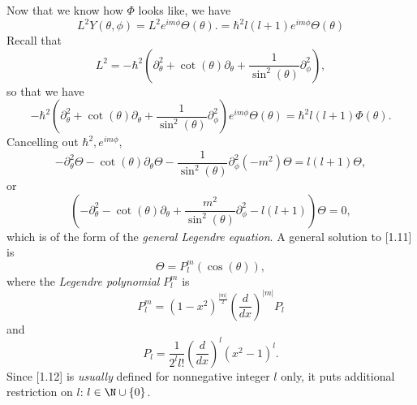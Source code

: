 \documentclass[phys334]{subfiles}
\begin{document}
    Now that we know how $\Phi$ looks like, we have
    \begin{equation*}
        L^{2}Y\left( \theta,\phi \right) = L^{2}e^{im\phi}\Theta\left( \theta \right). = \hbar^{2} l\left( l+1 \right)e^{im\phi}\Theta\left( \theta \right)
    \end{equation*}
    Recall that
    \begin{equation*}
        L^{2} = -\hbar^{2}\left( \partial_{\theta}^{2}+\cot\left( \theta \right)\partial_{\theta}+\frac{1}{\sin^{2}\left( \theta \right)}\partial_{\phi}^{2} \right) ,
    \end{equation*}
    so that we have
    \begin{equation*}
        -\hbar^{2}\left( \partial_{\theta}^{2}+\cot\left( \theta \right)\partial_{\theta}+\frac{1}{\sin^{2}\left( \theta \right)}\partial_{\phi}^{2} \right) e^{im\phi}\Theta\left( \theta \right) = \hbar^{2} l\left( l+1 \right)\Phi\left( \theta \right).
    \end{equation*}
    Cancelling out $\hbar^{2},e^{im\phi}$,
    \begin{equation*}
        -\partial_{\theta}^{2}\Theta-\cot\left( \theta \right)\partial_{\theta}\Theta-\frac{1}{\sin^{2}\left( \theta \right)}\partial_{\phi}^{2} \left( -m^{2} \right)\Theta = l\left( l+1 \right)\Theta,
    \end{equation*}
    or
    \begin{equation}
        \left(-\partial_{\theta}^{2}-\cot\left( \theta \right)\partial_{\theta}+\frac{m^{2}}{\sin^{2}\left( \theta \right)}\partial_{\phi}^{2} - l\left( l+1 \right)\right) \Theta = 0,
    \end{equation}
    which is of the form of the \textit{general Legendre equation}. A general solution to [1.11] is
    \begin{equation*}
        \Theta = P_l^m\left(\cos\left( \theta \right)\right),
    \end{equation*}
    where the \textit{Legendre polynomial} $P_l^m$ is
    \begin{equation*}
        P_l^m = \left( 1-x^{2} \right)^{\frac{\left| m \right|}{2}} \left( \frac{d}{dx} \right)^{\left| m \right|} P_l
    \end{equation*}
    and
    \begin{equation}
        P_l = \frac{1}{2^ll!}\left( \frac{d}{dx} \right)^l \left( x^{2}-1 \right)^l.
    \end{equation}
    Since [1.12] is \textit{usually} defined for nonnegative integer $l$ only, it puts additional restriction on $l$: $l\in\N\cup\left\lbrace 0 \right\rbrace$.
\end{document}
